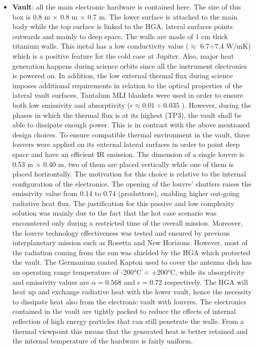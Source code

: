 \begin{itemize}
    \item \textbf{Vault}:  all the main electronic hardware is contained here. The size of this box is 0.8 m $\times$ 0.8 m $\times$ 0.7 m. The lower surface is attached to the main body while the top surface is linked to the HGA, lateral surfaces points outwards and mainly to deep space. The walls are made of 1 cm thick titanium walls. This metal has a low conductivity value ($\approx$ 6.7$\div$7.4 W/mK) which is a positive feature for the cold case at Jupiter. Also, major heat generation happens during science orbits since all the instrument electronics is powered on. In addition, the low external thermal flux during science imposes additional requirements in relation to the optical properties of the lateral vault surfaces. 
    Tantalum MLI blankets were used in order to ensure both low emissivity and absorptivity ($\epsilon \approx 0.01 \div 0.035$ \mref). 
    However, during the phases in which the thermal flux is at its highest (TP3), the vault shall be able to dissipate enough power. This is in contrast with the above mentioned design choices. To ensure compatible thermal environment in the vault, three louvers were applied on its external lateral surfaces in order to point deep space and have an efficient IR emission. The dimension of a single louvre is 0.53 m $\times$ 0.40 m, two of them are placed vertically while one of them is placed horizontally. The motivation for this choice is relative to the internal configuration of the electronics.
    The opening of the louvre' shutters raises the emissivity value from 0.14 to 0.74 (\mref produttore), enabling higher out-going radiative heat flux. 
    The justification for this passive and low complexity solution  was mainly due to the fact that the hot case scenario was encountered only during a restricted time of the overall mission. Moreover, the louvre technology effectiveness was tested and ensured by previous interplanetary mission such as Rosetta and New Horizons. 
    However, most of the radiation coming from the sun was shielded by the HGA which protected the vault. 
    The Germanium coated Kapton used to cover the antenna dish has an operating range temperature of -200°C $\div$ +200°C, while its absorptivity and emissivity values are $\alpha = 0.568$ and  $\epsilon = 0.72$ respectively\mref.
    The HGA will heat up and exchange radiative heat with the lower vault, hence the necessity to dissipate heat also from the electronic vault with louvres.
    The electronics contained in the vault are tightly packed to reduce the effects of internal reflection of high energy particles that can still penetrate the walls. From a thermal viewpoint this means that the generated heat is better retained and the internal temperature of the hardware is fairly uniform.
    

\end{itemize}
